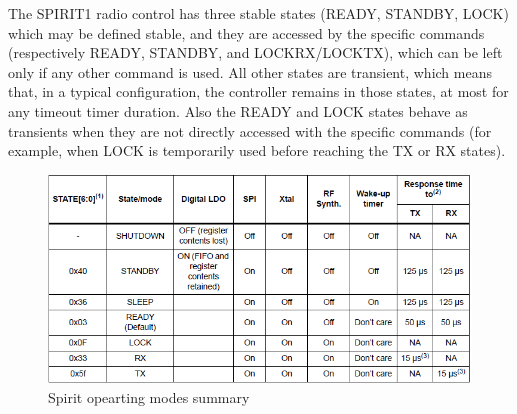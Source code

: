The SPIRIT1 radio control has three stable states (READY, STANDBY, LOCK) which may be defined stable, and they are accessed by the specific commands (respectively READY, STANDBY, and LOCKRX/LOCKTX), which can be left only if any other command is used. All other states are transient, which means that, in a typical configuration, the controller remains in those states, at most for any timeout timer duration. Also the READY and LOCK states behave as transients when they are not directly accessed with the specific commands (for example, when LOCK is temporarily used before reaching the TX or RX states).
\begin{figure}[ht]
	\centering
	\includegraphics[scale=0.8]{images/table.png}
	\caption{Spirit opearting modes summary}
\end{figure}


